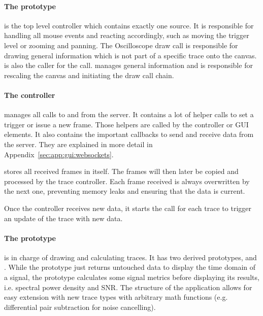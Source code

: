 %
%

\paragraph{The   prototype}  is  the  top level  controller
which contains  exactly one source. It  is responsible for handling  all mouse
events  and  reacting  accordingly,  such  as  moving  the  trigger  level  or
zooming and  panning.  The Oscilloscope  draw call is responsible  for drawing
general information  which is not  part of a  specific trace onto  the canvas.
  is  also  the  caller for  the    
call.   manages general information and  is responsible for
rescaling the canvas and initiating the draw call chain.

\paragraph{The    controller}  manages  all  calls  to  and  from
the  server. It  contains  a  lot  of   helper  calls  to  set  a  trigger  or
issue  a  new  frame. Those  helpers are  called  by  the  
controller or GUI elements.  It also  contains the important callbacks to send
and  receive data  from  the  server. They are  explained  in  more detail  in
Appendix~\ref{sec:app:gui:websockets}.

 stores all received frames in itself. The frames will then later
be  copied and  processed by  the trace  controller.  Each  frame received  is
always overwritten by the next one,  preventing memory leaks and ensuring that
the data is current.

Once  the     controller  receives   new  data,  it   starts  the
 call for each  trace to trigger an update of  the trace with new
data.

\paragraph{The  prototype} is in charge of drawing and calculating
traces. It has  two derived  prototypes,   and .
While the   prototype just  returns untouched data  to display
the  time domain  of a  signal, the   prototype  calculates some
signal metrics before displaying its  results, i.e. spectral power density and
SNR. The structure of the application allows for easy extension with new trace
types with  arbitrary math functions  (e.g. differential pair  subtraction for
noise cancelling).

